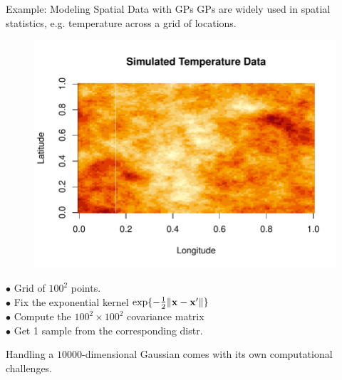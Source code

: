\documentclass[11pt,handout,aspectratio=169]{beamer}
\begin{document}
\begin{frame}{Example: Modeling Spatial Data with GPs}
GPs are widely used in spatial statistics, e.g. temperature across a grid of locations.\\[3mm]
\begin{minipage}{7cm}
	\begin{figure}
	\includegraphics[width=
	\textwidth]{pics/GP_temp.pdf}
\end{figure}
\end{minipage}\begin{minipage}{8cm}
$\bullet$	Grid of $100^2$ points. \\[2mm]
$\bullet$ Fix the exponential kernel $\exp\{-\tfrac12\|\mathbf{x}-\mathbf{x}'\|\}$\\[2mm]
$\bullet$ Compute the $100^2\times 100^2$ covariance matrix\\[2mm]
$\bullet$ Get 1 sample from the corresponding distr.\\[2mm]
\end{minipage}
\medskip

Handling a $10000$-dimensional Gaussian comes with its own computational challenges.  
\end{frame}
\end{document}
